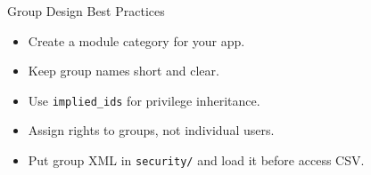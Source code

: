\begin{frame}{Group Design Best Practices}
	\begin{itemize}
		\item Create a module category for your app.
		\item Keep group names short and clear.
		\item Use \texttt{implied\_ids} for privilege inheritance.
		\item Assign rights to groups, not individual users.
		\item Put group XML in \texttt{security/} and load it before access CSV.
	\end{itemize}
\end{frame}
